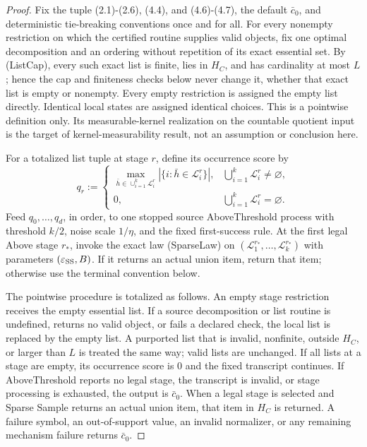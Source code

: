 \begin{proof}
Fix the tuple (2.1)-(2.6), (4.4), and (4.6)-(4.7), the default
\(\bar c_0\), and deterministic tie-breaking conventions once and for all.
For every nonempty restriction on which the certified routine supplies valid
objects, fix one optimal decomposition and an ordering without repetition of
its exact essential set. By (ListCap), every such exact list is finite, lies
in \(H_C\), and has cardinality at most \(L\); hence the cap and finiteness
checks below never change it, whether that exact list is empty or nonempty.
Every empty restriction is assigned the empty list directly. Identical local
states are assigned identical choices. This is a pointwise definition only.
Its measurable-kernel realization on the countable quotient input is the
target of kernel-measurability result, not an assumption or conclusion here.

For a totalized list tuple at stage \(r\), define its occurrence score by
\[
q_r:=
\begin{cases}
\displaystyle\max_{\bar h\in\cup_{i=1}^k\mathcal L_i^r}
|\{i:\bar h\in\mathcal L_i^r\}|,
&\bigcup_{i=1}^k\mathcal L_i^r\ne\varnothing,\\[4pt]
0,&\bigcup_{i=1}^k\mathcal L_i^r=\varnothing.
\end{cases}
\tag{5.1}
\]
Feed \(q_0,\ldots,q_d\), in order, to one stopped source
AboveThreshold process with threshold \(k/2\), noise scale \(1/\eta\), and
the fixed first-success rule. At the first legal Above stage \(r_*\), invoke
the exact law (SparseLaw) on
\((\mathcal L_1^{r_*},\ldots,\mathcal L_k^{r_*})\) with parameters
\((\varepsilon_{\rm SS},B)\). If it returns an actual union item, return
that item; otherwise use the terminal convention below.

The pointwise procedure is totalized as follows. An empty stage restriction
receives the empty essential list. If a source decomposition or list routine
is undefined, returns no valid object, or fails a declared check, the local
list is replaced by the empty list. A purported list that is invalid,
nonfinite, outside \(H_C\), or larger than \(L\) is treated the same way;
valid lists are unchanged. If all lists at a stage are empty, its occurrence
score is \(0\) and the fixed transcript continues. If AboveThreshold reports
no legal stage, the transcript is invalid, or stage processing is exhausted,
the output is \(\bar c_0\). When a legal stage is selected and Sparse Sample
returns an actual union item, that item in \(H_C\) is returned. A failure
symbol, an out-of-support value, an invalid normalizer, or any remaining
mechanism failure returns \(\bar c_0\).


\end{proof}
